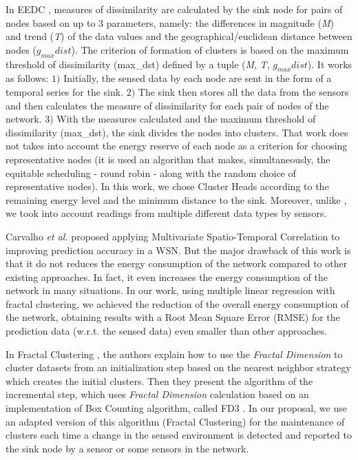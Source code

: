 \documentclass{acm_proc_article-sp}
\begin{document}
In EEDC \cite{Liu2007}, measures of dissimilarity are calculated by the sink
node for pairs of nodes based on up to $3$ parameters, namely:
the differences in magnitude (\textit{M}) and trend (\textit{T}) of the data
values and the geographical/euclidean distance between nodes ($g_{max}dist$).
The criterion of formation of clusters is based on the maximum threshold of
dissimilarity (max\_dst) defined by a tuple (\textit{M}, \textit{T},
$g_{max}dist$). It works as follows: $1)$ Initially, the sensed data by each
node are sent in the form of a temporal series for the sink. $2)$ The sink then
stores all the data from the sensors and then calculates the measure of
dissimilarity for each pair of nodes of the network. $3)$
With the measures calculated and the maximum threshold of dissimilarity
(max\_dst), the sink divides the nodes into clusters.
That work does not takes into account the energy reserve of each node as a
criterion for choosing representative nodes (it is used an algorithm that makes,
simultaneously, the equitable scheduling - round robin - along with the random
choice of representative nodes). In this work, we chose Cluster Heads according
to the remaining energy level and the minimum distance to the sink. Moreover,
unlike \cite{Liu2007}, we took into account readings from multiple different
data types by sensors.
\vspace*{-.3cm}

Carvalho \textit{et al.} \cite{Carvalho2011} proposed applying Multivariate
Spatio-Temporal Correlation to improving prediction accuracy in a WSN. But the
major drawback of this work is that it do not reduces the energy consumption of
the network compared to other existing approaches. In fact, it even increases
the energy consumption of the network in many situations. In our work, using
multiple linear regression with fractal clustering, we achieved the reduction of
the overall energy consumption of the network, obtaining results with a Root
Mean Square Error (RMSE) for the prediction data (w.r.t. the sensed data) even
smaller than other approaches.
\vspace*{-.3cm}

In Fractal Clustering \cite{Barbara2000}, the authors explain how to use the
\textit{Fractal Dimension} to cluster datasets from an initialization step
based on the nearest neighbor strategy which creates the initial clusters. Then
they present the algorithm of the incremental step, which uses \textit{Fractal
Dimension} calculation based on an implementation of Box Counting algorithm,
called FD3 \cite{Liebovitch1989}. In our proposal, we use an adapted version of
this algorithm (Fractal Clustering) for the maintenance of clusters each time a
change in the sensed environment is detected and reported to the sink node by
a sensor or some sensors in the network.
\end{document}
